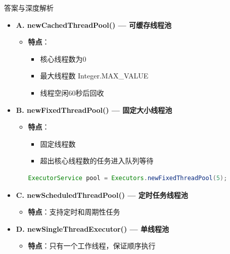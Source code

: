 \documentclass[12pt, a4paper]{ctexart}
\begin{document}
\begin{enumerate}[label=\textbf{\arabic*.}]
\begin{bluebox}{答案与深度解析}
\begin{itemize}[label={}, leftmargin=*, nosep]
		      \item \textbf{A. newCachedThreadPool() — 可缓存线程池}
		      \begin{itemize}[label={}, leftmargin=*, nosep]
			      \item \textbf{特点}：
			            \begin{itemize}[label={}, nosep]
				            \item 核心线程数为0
				            \item 最大线程数 Integer.MAX\_VALUE
				            \item 线程空闲60秒后回收
			            \end{itemize}
		      \end{itemize}

		      \item \textbf{B. newFixedThreadPool() — 固定大小线程池}
		      \begin{itemize}[label={}, leftmargin=*, nosep]
			      \item \textbf{特点}：
			            \begin{itemize}[label={}, nosep]
				            \item 固定线程数
				            \item 超出核心线程数的任务进入队列等待
			            \end{itemize}
			            \begin{lstlisting}[language=Java]
ExecutorService pool = Executors.newFixedThreadPool(5);
      \end{lstlisting}
		      \end{itemize}

		      \item \textbf{C. newScheduledThreadPool() — 定时任务线程池}
		      \begin{itemize}[label={}, leftmargin=*, nosep]
			      \item \textbf{特点}：支持定时和周期性任务
		      \end{itemize}

		      \item \textbf{D. newSingleThreadExecutor() — 单线程池}
		      \begin{itemize}[label={}, leftmargin=*, nosep]
			      \item \textbf{特点}：只有一个工作线程，保证顺序执行
		      \end{itemize}


\end{itemize}
\end{bluebox}
\end{enumerate}
\end{document}
